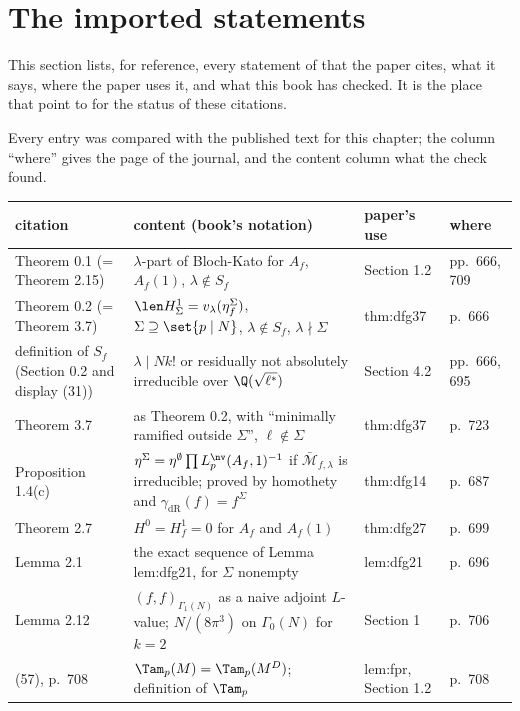 \section{The imported statements}\label{sec:congruence:imported}

This section lists, for reference, every statement of \cite{DFG04} that the paper cites, what it says, where the paper uses it, and what this book has checked. It is the place that
 point to for the status of these citations.

\begin{remark}\label{rem:congruence:imported-table}
Every entry was compared with the published text \cite{DFG04} for this chapter; the column ``where'' gives the page of the journal, and the content column what the check found.
\begin{center}\small
\begin{tabular}{p{}p{}p{}p{}}
\toprule
citation & content (book's notation) & paper's use & where\\
\midrule
Theorem 0.1 (= Theorem 2.15) & $\lambda$-part of Bloch-Kato for $A_f$, $A_f(1)$, $\lambda\notin S_f$ & Section 1.2 & pp.~666, 709\\
Theorem 0.2 (= Theorem 3.7) & $\len H^1_\Sigma=v_\lambda(\eta^\Sigma_f)$, $\Sigma\supseteq\set{p\mid N}$, $\lambda\notin S_f$, $\lambda\nmid\Sigma$ & thm:dfg37 & p.~666\\
definition of $S_f$ (Section 0.2 and display (31)) & $\lambda\mid Nk!$ or residually not absolutely irreducible over $\Q(\sqrt{\ell^*})$ & Section 4.2 & pp.~666, 695\\
Theorem 3.7 & as Theorem 0.2, with ``minimally ramified outside $\Sigma$'', $\ell\notin\Sigma$ & thm:dfg37 & p.~723\\
Proposition 1.4(c) & $\eta^\Sigma=\eta^\emptyset\prod L^{\nv}_p(A_f,1)^{-1}$ if $\bar{\mathcal M}_{f,\lambda}$ is irreducible; proved by homothety and $\gamma_{\mathrm{dR}}(f)=f^\Sigma$ & thm:dfg14 & p.~687\\
Theorem 2.7 & $H^0=H^1_f=0$ for $A_f$ and $A_f(1)$ & thm:dfg27 & p.~699\\
Lemma 2.1 & the exact sequence of Lemma lem:dfg21, for $\Sigma$ nonempty & lem:dfg21 & p.~696\\
Lemma 2.12 & $(f,f)_{\Gamma_1(N)}$ as a naive adjoint $L$-value; $N/(8\pi^3)$ on $\Gamma_0(N)$ for $k=2$ & Section 1 & p.~706\\
(57), p.~708 & $\Tam_p(M)=\Tam_p(M^D)$; definition of $\Tam_p$ & lem:fpr, Section 1.2 & p.~708\\

\end{tabular}
\end{center}
\end{remark}
